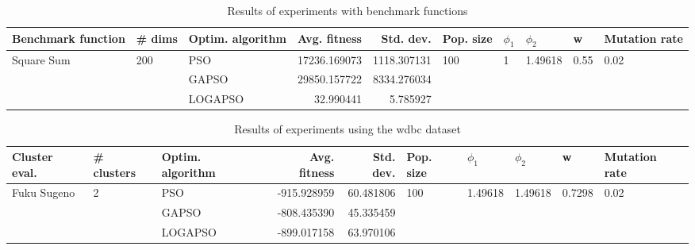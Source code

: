 \documentclass{article}
\begin{document}
\begin{table}
\centering
\caption{Results of experiments with benchmark functions}
\begin{tabular}{lllrrlllll}
\toprule
         Benchmark function &              \# dims & Optim. algorithm &  Avg. fitness &   Std. dev. &            Pop. size &         $\phi_{1}$ &               $\phi_{2}$ &                     w &         Mutation rate \\
\midrule
\multirow{3}{*}{Square Sum} & \multirow{3}{*}{200} &              PSO &  17236.169073 & 1118.307131 & \multirow{3}{*}{100} & \multirow{3}{*}{1} & \multirow{3}{*}{1.49618} & \multirow{3}{*}{0.55} & \multirow{3}{*}{0.02} \\
                            &                      &            GAPSO &  29850.157722 & 8334.276034 &                      &                    &                          &                       &                       \\
                            &                      &          LOGAPSO &     32.990441 &    5.785927 &                      &                    &                          &                       &                       \\
\bottomrule
\end{tabular}
\end{table}
\begin{table}
\centering
\caption{Results of experiments using the wdbc dataset}
\begin{tabular}{lllrrlllll}
\toprule
               Cluster eval. &        \# clusters & Optim. algorithm &  Avg. fitness &  Std. dev. &            Pop. size &               $\phi_{1}$ &               $\phi_{2}$ &                       w &         Mutation rate \\
\midrule
\multirow{3}{*}{Fuku Sugeno} & \multirow{3}{*}{2} &              PSO &   -915.928959 &  60.481806 & \multirow{3}{*}{100} & \multirow{3}{*}{1.49618} & \multirow{3}{*}{1.49618} & \multirow{3}{*}{0.7298} & \multirow{3}{*}{0.02} \\
                             &                    &            GAPSO &   -808.435390 &  45.335459 &                      &                          &                          &                         &                       \\
                             &                    &          LOGAPSO &   -899.017158 &  63.970106 &                      &                          &                          &                         &                       \\
\bottomrule
\end{tabular}
\end{table}
\end{document}

